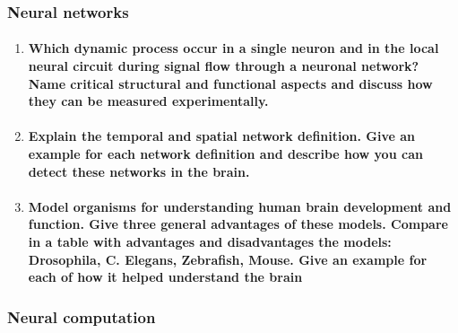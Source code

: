 \documentclass[12pt,article,oneside,a4paper]{memoir}
\begin{document}
\subsubsection{Neural networks}
\begin{enumerate}
\item \paragraph{Which dynamic process occur in a single neuron and in the local neural circuit during signal flow through a neuronal network? Name critical structural and functional aspects and discuss how they can be measured experimentally.}

\item \paragraph{Explain the temporal and spatial network definition. Give an example for each network definition and describe how you can detect these networks in the brain.}

\item \paragraph{Model organisms for understanding human brain development and function. Give three general advantages of these models. Compare in a table with advantages and disadvantages the models: Drosophila, C. Elegans, Zebrafish, Mouse. Give an example for each of how it helped understand the brain}

\end{enumerate}

\subsubsection{Neural computation}
\end{document}
